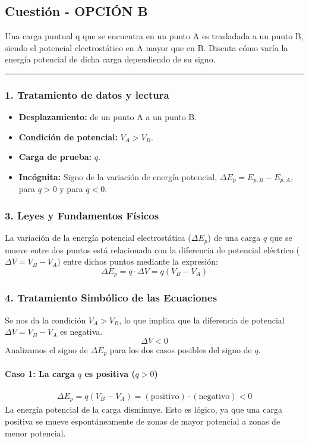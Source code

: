 \newpage

\subsection{Cuestión - OPCIÓN B}
\label{subsec:4B_2011_sep_ext}

\begin{cajaenunciado}
Una carga puntual q que se encuentra en un punto A es trasladada a un punto B, siendo el potencial electrostático en A mayor que en B. Discuta cómo varía la energía potencial de dicha carga dependiendo de su signo.
\end{cajaenunciado}
\hrule

\subsubsection*{1. Tratamiento de datos y lectura}
\begin{itemize}
    \item \textbf{Desplazamiento:} de un punto A a un punto B.
    \item \textbf{Condición de potencial:} $V_A > V_B$.
    \item \textbf{Carga de prueba:} $q$.
    \item \textbf{Incógnita:} Signo de la variación de energía potencial, $\Delta E_p = E_{p,B} - E_{p,A}$, para $q>0$ y para $q<0$.
\end{itemize}

\subsubsection*{3. Leyes y Fundamentos Físicos}
La variación de la energía potencial electrostática ($\Delta E_p$) de una carga $q$ que se mueve entre dos puntos está relacionada con la diferencia de potencial eléctrico ($\Delta V = V_B - V_A$) entre dichos puntos mediante la expresión:
$$\Delta E_p = q \cdot \Delta V = q(V_B - V_A)$$

\subsubsection*{4. Tratamiento Simbólico de las Ecuaciones}
Se nos da la condición $V_A > V_B$, lo que implica que la diferencia de potencial $\Delta V = V_B - V_A$ es negativa.
$$\Delta V < 0$$
Analizamos el signo de $\Delta E_p$ para los dos casos posibles del signo de $q$.

\paragraph{Caso 1: La carga $q$ es positiva ($q>0$)}
\begin{gather}
    \Delta E_p = q(V_B - V_A) = (\text{positivo}) \cdot (\text{negativo}) < 0
\end{gather}
La energía potencial de la carga disminuye. Esto es lógico, ya que una carga positiva se mueve espontáneamente de zonas de mayor potencial a zonas de menor potencial.

